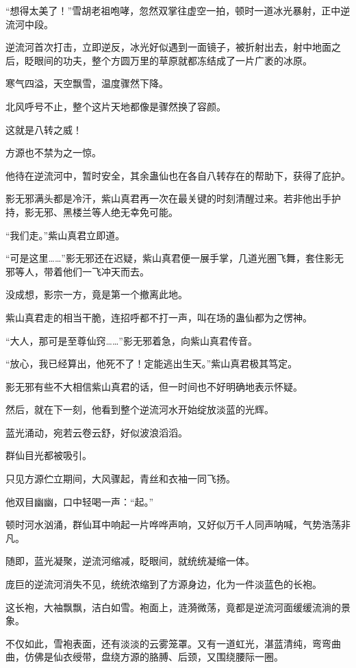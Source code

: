 \begin{this_body}
“想得太美了！”雪胡老祖咆哮，忽然双掌往虚空一拍，顿时一道冰光暴射，正中逆流河中段。

逆流河首次打击，立即逆反，冰光好似遇到一面镜子，被折射出去，射中地面之后，眨眼间的功夫，整个方圆万里的草原就都冻结成了一片广袤的冰原。

寒气四溢，天空飘雪，温度骤然下降。

北风呼号不止，整个这片天地都像是骤然换了容颜。

这就是八转之威！

方源也不禁为之一惊。

他待在逆流河中，暂时安全，其余蛊仙也在各自八转存在的帮助下，获得了庇护。

影无邪满头都是冷汗，紫山真君再一次在最关键的时刻清醒过来。若非他出手护持，影无邪、黑楼兰等人绝无幸免可能。

“我们走。”紫山真君立即道。

“可是这里……”影无邪还在迟疑，紫山真君便一展手掌，几道光圈飞舞，套住影无邪等人，带着他们一飞冲天而去。

没成想，影宗一方，竟是第一个撤离此地。

紫山真君走的相当干脆，连招呼都不打一声，叫在场的蛊仙都为之愣神。

“大人，那可是至尊仙窍……”影无邪着急，向紫山真君传音。

“放心，我已经算出，他死不了！定能逃出生天。”紫山真君极其笃定。

影无邪有些不大相信紫山真君的话，但一时间也不好明确地表示怀疑。

然后，就在下一刻，他看到整个逆流河水开始绽放淡蓝的光辉。

蓝光涌动，宛若云卷云舒，好似波浪滔滔。

群仙目光都被吸引。

只见方源伫立期间，大风骤起，青丝和衣袖一同飞扬。

他双目幽幽，口中轻喝一声：“起。”

顿时河水汹涌，群仙耳中响起一片哗哗声响，又好似万千人同声呐喊，气势浩荡非凡。

随即，蓝光凝聚，逆流河缩减，眨眼间，就统统凝缩一体。

庞巨的逆流河消失不见，统统浓缩到了方源身边，化为一件淡蓝色的长袍。

这长袍，大袖飘飘，洁白如雪。袍面上，涟漪微荡，竟都是逆流河面缓缓流淌的景象。

不仅如此，雪袍表面，还有淡淡的云雾笼罩。又有一道虹光，湛蓝清纯，弯弯曲曲，仿佛是仙衣绶带，盘绕方源的胳膊、后颈，又围绕腰际一圈。


\end{this_body}

